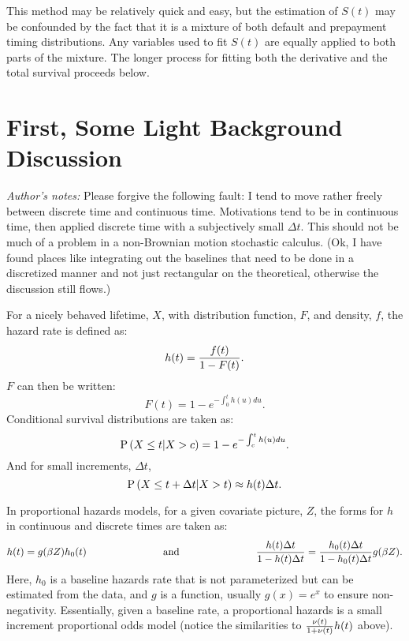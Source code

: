\documentclass[10pt]{article}
\begin{document}
    This method may be relatively quick and easy, but the estimation of $S(t)$ may be confounded 
by the fact that it is a mixture of both default and prepayment timing distributions.  Any variables used to fit $S(t)$ are equally applied to both 
parts of the mixture.  The longer process for fitting both the derivative and the total survival proceeds below.
 
\section{First, Some Light Background Discussion}
 
{\em Author's notes:} Please forgive the following fault: I tend to move rather freely between discrete time and continuous time.  Motivations tend to be in continuous time, 
then applied discrete time with a subjectively small $\Delta t$.  This should not be much of a problem in a non-Brownian motion stochastic calculus.
(Ok, I have found places like integrating out the baselines that need to be done in a discretized manner and not just rectangular on the theoretical, 
otherwise the discussion still flows.)

For a nicely behaved lifetime, $X$, with distribution function, $F$, and density, $f$, the hazard rate is defined as:
$$h(t)={f(t)\over 1-F(t)}.$$
$F$ can then be written:
$$F(t)=1-e^{-\int_0^th(u)du}.$$
Conditional survival distributions are taken as:
$$\text{P}\left({X \le t | X > c}\right)=1-e^{-\int_c^th(u)du}.$$
And for small increments, $\Delta t$,
$$\text{P}\left({X \le t+\Delta t | X>t}\right) \approx h(t)\Delta t.$$
 
In proportional hazards models, for a given covariate picture, $Z$, the forms for $h$ in continuous and discrete times are taken as:
$$h(t)=g(\beta Z)h_0(t)   \hspace{1in} \text{ and }   \hspace{1in}  {h(t)\Delta t \over 1-h(t)\Delta t }={h_0(t)\Delta t \over 1-h_0(t)\Delta t }g(\beta Z).$$
Here, $h_0$ is a baseline hazards rate that is not parameterized but can be estimated from the data, and $g$ is a function, usually $g(x)=e^x$ to 
ensure non-negativity.
Essentially, given a baseline rate, a proportional hazards is a small increment proportional odds model (notice the similarities to ${\nu(t)\over 1+\nu(t)}h(t)$ above).
 
\end{document}

